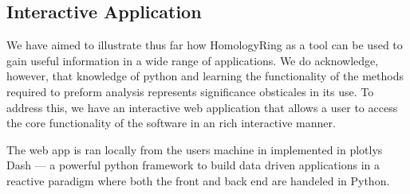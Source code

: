 \subsection{Interactive Application}
We have aimed to illustrate thus far how HomologyRing as a tool can be used to gain useful information in a wide range of applications. We do acknowledge, however, that knowledge of python and learning the functionality of the methods required to preform analysis represents significance obsticales in its use. To address this, we have an interactive web application that allows a user to access the core functionality of the software in an rich interactive manner. 

The web app is ran locally from the users machine in implemented in plotlys Dash --- a powerful python framework to build data driven applications in a reactive paradigm where both the front and back end are handeled in Python.

